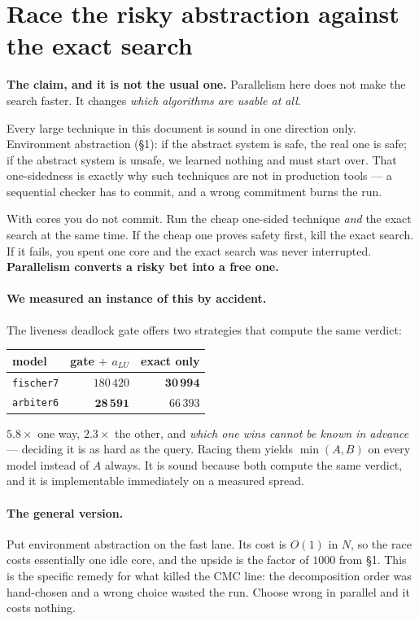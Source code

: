 \section{Race the risky abstraction against the exact search \hfill \live{}}

\textbf{The claim, and it is not the usual one.} Parallelism here does not make the search faster.
It changes \emph{which algorithms are usable at all}.

Every large technique in this document is sound in one direction only. Environment abstraction
(\S1): if the abstract system is safe, the real one is safe; if the abstract system is unsafe, we
learned nothing and must start over. That one-sidedness is exactly why such techniques are not in
production tools --- a sequential checker has to commit, and a wrong commitment burns the run.

With cores you do not commit. Run the cheap one-sided technique \emph{and} the exact search at the
same time. If the cheap one proves safety first, kill the exact search. If it fails, you spent one
core and the exact search was never interrupted. \textbf{Parallelism converts a risky bet into a
free one.}

\paragraph{We measured an instance of this by accident.} The liveness deadlock gate offers two
strategies that compute the same verdict:

\begin{center}
\begin{tabular}{@{}lrr@{}}
\toprule
model & gate $+$ $a_{LU}$ & exact only \\
\midrule
\texttt{fischer7} & $180\,420$ & $\mathbf{30\,994}$ \\
\texttt{arbiter6} & $\mathbf{28\,591}$ & $66\,393$ \\
\bottomrule
\end{tabular}
\end{center}

$5.8\times$ one way, $2.3\times$ the other, and \emph{which one wins cannot be known in advance} ---
deciding it is as hard as the query. Racing them yields $\min(A,B)$ on every model instead of $A$
always. It is sound because both compute the same verdict, and it is implementable immediately on a
measured spread.

\paragraph{The general version.} Put environment abstraction on the fast lane. Its cost is $O(1)$ in
$N$, so the race costs essentially one idle core, and the upside is the factor of $1000$ from \S1.
This is the specific remedy for what killed the CMC line: the decomposition order was hand-chosen
and a wrong choice wasted the run. Choose wrong in parallel and it costs nothing.

